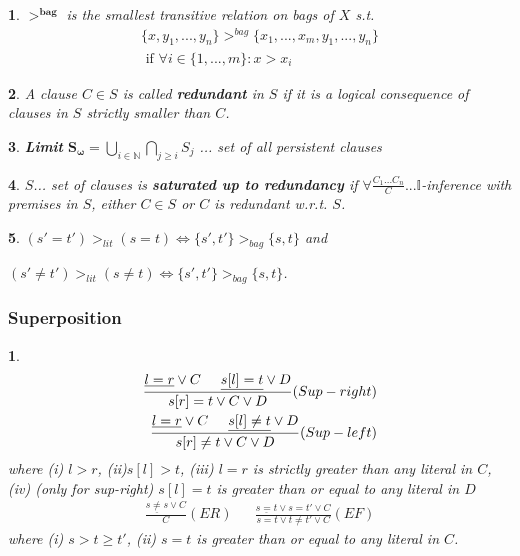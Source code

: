 \documentclass[]{article}
\newtheorem*{green}{}
\newtheorem*{blue}{}
\begin{document}
\begin{multicols}{3}
\begin{minipage}[t]{.31\textwidth}
\begin{green}
$\mathbf{>^{bag}}$ is the smallest transitive relation on bags of $X$ s.t.
\begin{align*}
	\{x,y_1,...,y_n\} >^{bag} \{x_1,...,x_m,y_1,...,y_n\}\\
	\text{ if } \forall i\in\{1,...,m\}: x>x_i
\end{align*}
\end{green}

\begin{green}
A clause $C \in S$ is called \textbf{redundant} in $S$ if it is a logical consequence of clauses in $S$ strictly smaller than $C$.
\end{green}

\end{minipage}

\newpage

\begin{minipage}[t]{.31\textwidth}
\begin{green}
	\textbf{Limit} $\mathbf{S_\omega} = \bigcup_{i\in\mathbb{N}} \bigcap_{j\geq i} S_j$ ... set of all persistent clauses
\end{green}

\begin{green}
$S$... set of clauses is \textbf{saturated up to redundancy} if $\forall \frac{C_1...C_n}{C} ... \mathbb{I}$-inference with premises in $S$, either $C \in S$ or $C$ is redundant w.r.t. $S$.
\end{green}

\begin{green}
$(s' = t') >_{lit} (s=t) \iff \{s',t'\}>_{bag}\{s,t\}$ and

$(s' \not= t') >_{lit} (s\not=t) \iff \{s',t'\}>_{bag}\{s,t\}$.
\end{green}

\subsubsection*{Superposition}
\begin{blue}
\begin{align*}
	\frac{\underline{l=r} \lor C \hspace{.5cm} \underline{s[l]=t} \lor D}{s[r]=t \lor C \lor D} (Sup-right)\\
	\frac{\underline{l=r} \lor C \hspace{.5cm} \underline{s[l]\not=t} \lor D}{s[r]\not=t \lor C \lor D} (Sup-left)\\
\end{align*}
where (i) $l>r$, (ii)$s[l]>t$, (iii) $l=r$ is strictly greater than any literal in $C$, (iv) (only for sup-right) $s[l]=t$ is greater than or equal to any literal in $D$
\begin{align*}
	\frac{\underline{s\not= s} \lor C}{C} (ER) && \frac{\underline{s=t} \lor s=t' \lor C}{s=t \lor t\not= t' \lor C} (EF)
\end{align*}
where (i) $s>t\geq t'$, (ii) $s=t$ is greater than or equal to any literal in $C$.
\end{blue}


\end{minipage}
\end{multicols}
\end{document}
